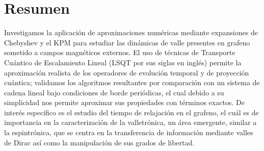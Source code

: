 \chapter{Resumen}

Investigamos la aplicación de aproximaciones numéricas mediante expansiones de Chebyshev y el KPM para estudiar las dinámicas de valle presentes en grafeno sometido a campos magnéticos externos. El uso de técnicas de Transporte Cuántico de Escalamiento Lineal (LSQT por sus siglas en inglés) permite la aproximación realista de los operadores de evolución temporal y de proyección cuántica; validamos los algoritmos resultantes por comparación con un sistema de cadena lineal bajo condiciones de borde periódicas, el cual debido a su simplicidad nos permite aproximar sus propiedades con términos exactos. De interés específico es el estudio del tiempo de relajación en el grafeno, el cuál es de importancia en la caracterización de la valletrónica, un área emergente, similar a la espintrónica, que se centra en la transferencia de información mediante valles de Dirac así como la manipulación de sus grados de libertad.

